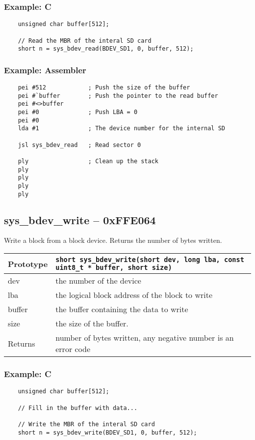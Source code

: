 \subsubsection*{Example: C}
\begin{lstlisting}
    unsigned char buffer[512];
    
    // Read the MBR of the interal SD card
    short n = sys_bdev_read(BDEV_SD1, 0, buffer, 512);
\end{lstlisting}

\subsubsection*{Example: Assembler}
\begin{verbatim}
    pei #512			; Push the size of the buffer
    pei #`buffer		; Push the pointer to the read buffer
    pei #<>buffer
    pei #0				; Push LBA = 0
    pei #0
    lda #1				; The device number for the internal SD

    jsl sys_bdev_read	; Read sector 0

    ply					; Clean up the stack
    ply
    ply
    ply
    ply
\end{verbatim}

\subsection*{sys\_bdev\_write -- 0xFFE064}
Write a block from a block device. Returns the number of bytes written.

\bigskip

\begin{tabular}{|l||l|} \hline
Prototype & \lstinline!short sys_bdev_write(short dev, long lba, const uint8_t * buffer, short size)! \\ \hline
dev & the number of the device \\ \hline
lba & the logical block address of the block to write \\ \hline
buffer & the buffer containing the data to write \\ \hline
size & the size of the buffer. \\ \hline
Returns & number of bytes written, any negative number is an error code \\ \hline
\end{tabular}

\subsubsection*{Example: C}
\begin{lstlisting}
    unsigned char buffer[512];

    // Fill in the buffer with data...
    
    // Write the MBR of the interal SD card
    short n = sys_bdev_write(BDEV_SD1, 0, buffer, 512);
\end{lstlisting}

